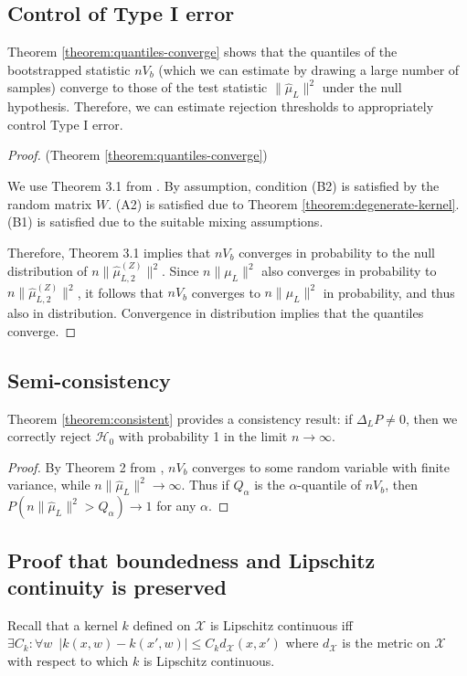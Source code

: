 \documentclass[]{article}
\begin{document}
\subsection{Control of Type I error}\label{supp:quantile-proof}
Theorem \ref{theorem:quantiles-converge} shows that the quantiles of the bootstrapped statistic $nV_b$ (which we can estimate by drawing a large number of samples) converge to those of the test statistic $\|\hat \mu_L\|^2$ under the null hypothesis. Therefore, we can estimate rejection thresholds to appropriately control Type I error.

\begin{proof}(Theorem \ref{theorem:quantiles-converge})

We use Theorem 3.1 from \citet{leucht2013dependent}. By assumption, condition (B2) is satisfied by the random matrix $W$. (A2) is satisfied due to Theorem \ref{theorem:degenerate-kernel}. (B1) is satisfied due to the suitable mixing assumptions.

Therefore, Theorem 3.1 implies that $nV_b$ converges in probability to the null distribution of $n\|\hat \mu_{L,2}^{(Z)}\|^2$. Since $n\|\mu_L\|^2$ also converges in probability to $n\|\hat \mu_{L,2}^{(Z)}\|^2$, it follows that $nV_b$ converges to $n\|\mu_L\|^2$ in probability, and thus also in distribution. Convergence in distribution implies that the quantiles converge.
\end{proof} 



\subsection{Semi-consistency}\label{supp:consistent}
Theorem \ref{theorem:consistent} provides a consistency result: if $\Delta_LP\not = 0$, then we correctly reject $\mathcal{H}_0$ with probability 1 in the limit $n\longrightarrow\infty$.

\begin{proof}
By Theorem 2 from \citet{chwialkowski2014wild}, $nV_b$ converges to some random variable with finite variance, while $n\|\hat{\mu}_L\|^2 \longrightarrow \infty$. Thus if $Q_\alpha$ is the $\alpha$-quantile of $nV_b$, then $P(n\|\hat{\mu}_L\|^2 > Q_\alpha) \longrightarrow 1 $ for any $\alpha$.
\end{proof}

\subsection{Proof that boundedness and Lipschitz continuity is preserved}\label{supp:bounded-and-lipschitz}
Recall that a kernel $k$ defined on $\mathcal{X}$ is Lipschitz continuous iff $\exists C_k : \forall w \enspace |k(x,w) - k(x',w)| \leq C_k d_\mathcal{X}(x,x')$ where $d_\mathcal{X}$ is the metric on $\mathcal{X}$ with respect to which $k$ is Lipschitz continuous.
\end{document}
